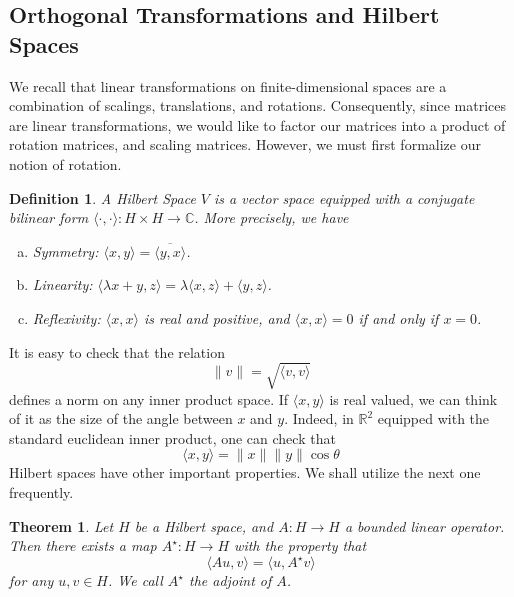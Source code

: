 \documentclass[12pt,reqno]{amsart}
\numberwithin{equation}{section}  %
\newcommand{\rr}{\mathbb{R}}
\newcommand{\cc}{\mathbb{C}}
\newtheorem{theorem}{Theorem}
\newtheorem*{definition}{Definition}
\begin{document}
\subsection{Orthogonal Transformations and Hilbert Spaces}
We recall that linear transformations on finite-dimensional spaces are a combination
of scalings, translations, and rotations. Consequently, since matrices are linear transformations,
we would like to factor our matrices into a product of rotation matrices, and scaling matrices.
However, we must first formalize our notion of rotation. 
\begin{definition}
A Hilbert Space $V$ is a vector space equipped with a conjugate bilinear form 
$ \langle \cdot, \cdot \rangle : H \times H \to \cc $. More precisely, we have
\begin{enumerate}[a)]
\item{Symmetry:} $\langle x,y \rangle  = \overline{ \langle y,x \rangle   }$.
\item{Linearity:} $\langle \lambda x + y, z \rangle  =
\lambda \langle x, z \rangle  + \langle y, z \rangle$.
\item{Reflexivity:} $\langle x, x \rangle  $ is real and positive, 
and $\langle x, x \rangle = 0 $ if and only if $x = 0$.            
\end{enumerate}
\end{definition}
It is easy to check that the relation
\begin{equation*}
\| v \| = \sqrt{\langle v, v \rangle}
\end{equation*}
defines a norm on any inner product space. If $ \langle x, y \rangle $ is real
valued, we can think of it as the size of the angle between $x$
and $y$. Indeed, in $\rr^2$ equipped with the standard euclidean inner product,
one can check that
\begin{equation*}
\langle x, y \rangle  = \|x\| \|y\|\cos \theta
\end{equation*}
Hilbert spaces have other important properties. We shall utilize the next one 
frequently. 

\begin{theorem}
Let $H$ be a Hilbert space, and $A : H \to H$ a bounded linear operator. Then
there exists a map $A^{\star} : H \to H$ with the property that
\begin{equation*}
\langle Au, v \rangle  = \langle u, A^{\star}v \rangle 
\end{equation*}
for any $u, v \in H$. We call $A^{\star}$ the \emph{adjoint} of $A$.
\end{theorem}
\end{document}
